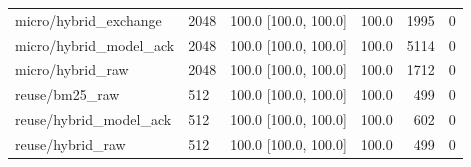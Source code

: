 \begin{tabular}{llrrrr}
micro/hybrid\_exchange & 2048 & 100.0 [100.0, 100.0] & 100.0 & 1995 & 0 \\
micro/hybrid\_model\_ack & 2048 & 100.0 [100.0, 100.0] & 100.0 & 5114 & 0 \\
micro/hybrid\_raw & 2048 & 100.0 [100.0, 100.0] & 100.0 & 1712 & 0 \\
reuse/bm25\_raw & 512 & 100.0 [100.0, 100.0] & 100.0 & 499 & 0 \\
reuse/hybrid\_model\_ack & 512 & 100.0 [100.0, 100.0] & 100.0 & 602 & 0 \\
reuse/hybrid\_raw & 512 & 100.0 [100.0, 100.0] & 100.0 & 499 & 0 \\
\bottomrule
\end{tabular}
